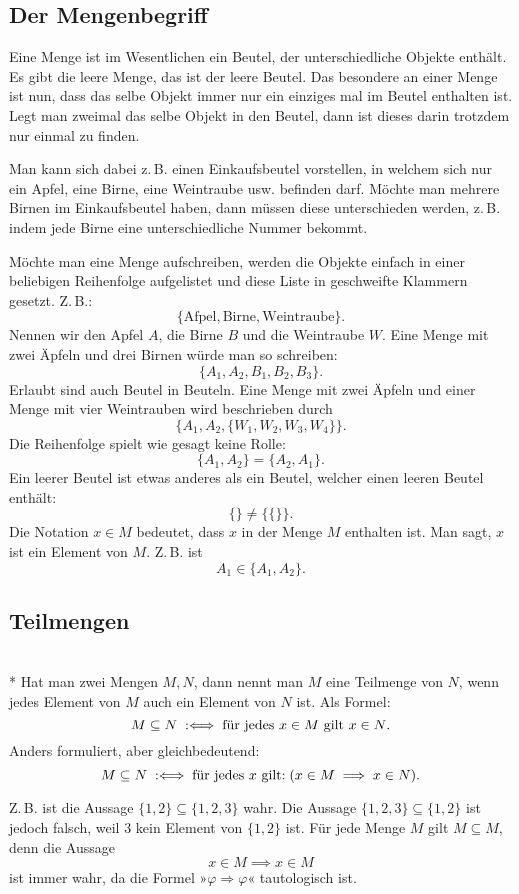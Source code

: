 \subsection{Der Mengenbegriff}

Eine Menge ist im Wesentlichen ein Beutel, der unterschiedliche
Objekte enthält. Es gibt die leere Menge, das ist der leere Beutel.
Das besondere an einer Menge ist nun, dass das selbe Objekt immer
nur ein einziges mal im Beutel enthalten ist. Legt man zweimal
das selbe Objekt in den Beutel, dann ist dieses darin trotzdem nur
einmal zu finden.

Man kann sich dabei z.\,B. einen Einkaufsbeutel vorstellen,
in welchem sich nur ein Apfel, eine Birne, eine Weintraube usw.
befinden darf. Möchte man mehrere Birnen im Einkaufsbeutel haben,
dann müssen diese unterschieden werden, z.\,B. indem jede Birne
eine unterschiedliche Nummer bekommt.

Möchte man eine Menge aufschreiben, werden die Objekte einfach
in einer beliebigen Reihenfolge aufgelistet und diese Liste in
geschweifte Klammern gesetzt. Z.\,B.:%
\[\{\mathrm{Afpel}, \mathrm{Birne}, \mathrm{Weintraube}\}.\]
Nennen wir den Apfel $A$, die Birne $B$
und die Weintraube $W$. Eine Menge mit zwei Äpfeln und drei
Birnen würde man so schreiben:%
\[\{A_1, A_2, B_1, B_2, B_3\}.\]
Erlaubt sind auch Beutel in Beuteln. Eine Menge mit zwei Äpfeln
und einer Menge mit vier Weintrauben wird beschrieben durch%
\[\{A_1, A_2, \{W_1,W_2,W_3,W_4\}\}.\]
Die Reihenfolge spielt wie gesagt keine Rolle:%
\[\{A_1,A_2\} = \{A_2,A_1\}.\]
Ein leerer Beutel ist etwas anderes als ein Beutel, welcher einen
leeren Beutel enthält:%
\[\{\} \ne \{\{\}\}.\]
Die Notation $x\in M$ bedeutet, dass $x$ in der Menge $M$ enthalten
ist. Man sagt, $x$ ist ein Element von $M$. Z.\,B. ist
\[A_1\in\{A_1,A_2\}.\]

\newpage
\subsection{Teilmengen}

\begin{Definition}[Teilmengenrelation]\mbox{}\\*
Hat man zwei Mengen $M,N$, dann nennt man $M$ eine Teilmenge von $N$,
wenn jedes Element von $M$ auch ein Element von $N$ ist.
Als Formel:
\[M\subseteq N\;:\Longleftrightarrow\; \text{für jedes $x\in M$ gilt $x\in N$}.\]
Anders formuliert, aber gleichbedeutend:
\[M\subseteq N\;:\Longleftrightarrow\; \text{für jedes $x$ gilt:}\; (x\in M\implies x\in N).\]
\end{Definition}
Z.\,B. ist die Aussage $\{1,2\}\subseteq\{1,2,3\}$ wahr.
Die Aussage $\{1,2,3\}\subseteq\{1,2\}$ ist jedoch falsch,
weil $3$ kein Element von $\{1,2\}$ ist. Für jede Menge $M$ gilt
$M\subseteq M$, denn die Aussage
\[x\in M\implies x\in M\]
ist immer wahr, da die Formel »$\varphi\Rightarrow\varphi$«
tautologisch ist.

